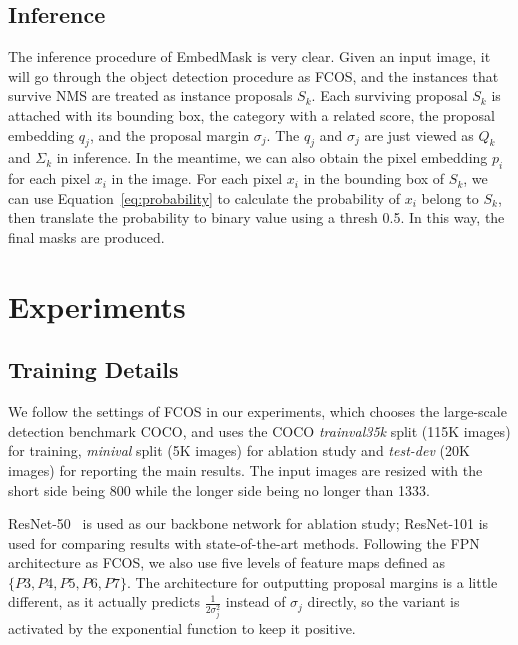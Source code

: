 \documentclass[10pt,twocolumn,letterpaper]{article}
\begin{document}
\subsection{Inference} 
The inference procedure of EmbedMask is very clear. 
Given an input image, it will go through the object detection procedure as FCOS, and the instances that survive NMS are treated as instance proposals $S_k$. 
Each surviving proposal $S_k$ is attached with its bounding box, the category with a related score, the proposal embedding $q_j$, and the proposal margin $\sigma_j$. 
The $q_j$ and $\sigma_j$ are just viewed as $Q_k$ and $\Sigma_k$ in inference. 
In the meantime, we can also obtain the pixel embedding $p_i$ for each pixel $x_i$ in the image. 
For each pixel $x_i$ in the bounding box of $S_k$, we can use Equation~\ref{eq:probability} to calculate the probability of $x_i$ belong to $S_k$, then translate the probability to binary value using a thresh 0.5. In this way, the final masks are produced. 

\section{Experiments}

\subsection{Training Details}

\medbreak
{}
We follow the settings of FCOS in our experiments, which chooses the large-scale detection benchmark COCO, and uses the COCO \textit{trainval35k} split (115K images) for training, \textit{minival} split (5K images) for ablation study and \textit{test-dev} (20K images) for reporting the main results. 
The input images are resized with the short side being 800 while the longer side being no longer than 1333.

\medbreak
{}
ResNet-50~\cite{he2016deep} is used as our backbone network for ablation study; ResNet-101 is used for comparing results with state-of-the-art methods. 
Following the FPN architecture as FCOS, we also use five levels of feature maps defined as $\{P3,P4,P5,P6,P7\}$.
The architecture for outputting proposal margins is a little different, as it actually predicts $\frac{1}{2\sigma_j^2}$ instead of $\sigma_j$ directly, so the variant is activated by the exponential function to keep it positive. 
\end{document}
